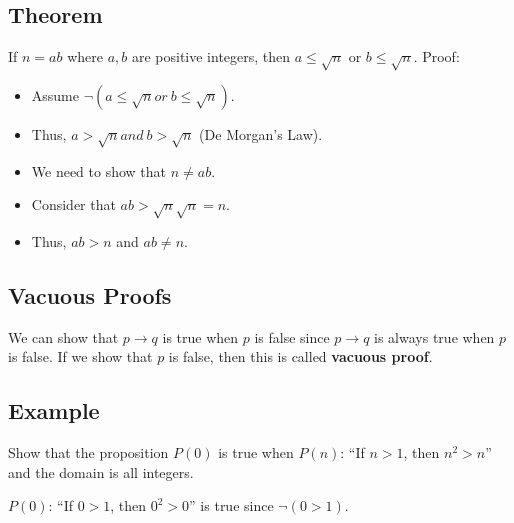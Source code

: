 \documentclass[letterpaper, 12pt]{math}
\begin{document}
\subsection*{Theorem}
If \( n = ab \) where \( a,b \) are positive integers, then \( a \leq \sqrt{n}
\) or \( b \leq \sqrt{n} \). Proof:
\begin{itemize}
  \item Assume \( \neg(a \leq \sqrt{n} or\ b \leq \sqrt{n}) \).
  \item Thus, \( a > \sqrt{n} and\ b > \sqrt{n} \) (De Morgan's Law).
  \item We need to show that \( n \neq ab \).
  \item Consider that \( ab > \sqrt{n}\sqrt{n} = n \).
  \item Thus, \( ab > n \) and \( ab \neq n \).
\end{itemize}

\subsection*{Vacuous Proofs}
We can show that \( p \to q \) is true when \( p \) is false since \( p \to q \)
is always true when \( p \) is false. If we show that \( p \) is false, then
this is called \textbf{vacuous proof}.

\subsection*{Example}
Show that the proposition \( P(0) \) is true when \( P(n) \): ``If \( n > 1 \),
then \( n^{2} > n \)'' and the domain is all integers. \par
\( P(0) \): ``If \( 0 > 1 \), then \( 0^{2} > 0 \)'' is true since
\( \neg{(0 > 1)} \).
\end{document}
